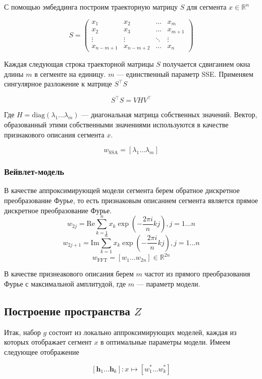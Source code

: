 \documentclass[12pt, fleqn, unicode]{article}
\newcommand{\bh}{\mathbf{h}}
\newcommand{\R}{\mathbb{R}}
\newcommand{\brs}[1]{\left(#1\right)}
\newcommand{\sbrs}[1]{\left[#1\right]}
\begin{document}
С помощью эмбеддинга построим траекторную матрицу $S$ для сегмента $x \in \R^n$

$$
S = \begin{pmatrix}
x_1 & x_2 & \dots & x_m \\
x_2 & x_3 & \dots & x_{m + 1} \\
\vdots & \vdots & \ddots & \vdots \\
x_{n - m + 1} & x_{n - m + 2} & \dots & x_n
\end{pmatrix}
$$

Каждая следующая строка траекторной матрицы $S$ получается сдвиганием окна
длины $m$ в сегменте на единицу. $m$ --- единственный параметр SSE.
Применяем сингулярное разложение к матрице $S^\intercal S$

$$
S^\intercal S = VHV^\intercal
$$

Где $H = \mathrm{diag}(\lambda_1\ldots \lambda_m)$ --- диагональная матрица
собственных значений. Вектор, образованный этими собственными значениями
используются в качестве признакового описания сегмента $x$.

$$
w_{\text{SSA}} = [\lambda_1 \ldots \lambda_m]
$$

\subsubsection{Вейвлет-модель}

В качестве аппроксимирующей модели сегмента берем обратное дискретное
преобразование Фурье,
то есть признаковым описанием сегмента является прямое дискретное преобразование
Фурье.
$$
    w_{2j} = \mathrm{Re} \sum_{k=1}^{n} x_k \exp\brs{-\frac{2\pi i}{n}kj}, j=1\ldots n
$$
$$
    w_{2j + 1} = \mathrm{Im} \sum_{k=1}^{n} x_k \exp\brs{-\frac{2\pi i}{n}kj}, j=1\ldots n
$$
$$
w_{\text{FFT}} = \sbrs{w_1\ldots w_{2n}}\in \R^{2n}
$$

В качестве признеакового описания берем $m$ частот из прямого преобразования
Фурье с максимальной амплитудой, где $m$ — параметр модели.

\subsection{Построение пространства $Z$}

Итак, набор $g$ состоит из локально аппроксимирующих моделей, каждая из которых
отображает сегмент $x$ в оптимальные параметры модели. Имеем следующее отображение

$$
[\bh_1\ldots \bh_k]: x \mapsto [w_1^* \ldots w_k^*]
$$
\end{document}

